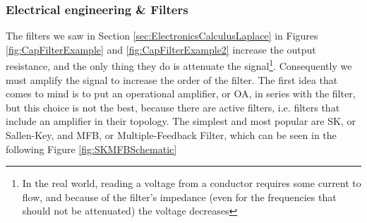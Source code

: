 \documentclass[a4paper, 10pt, final]{article} %
\begin{document}
    \subsubsection{Electrical engineering \& Filters}
    The filters we saw in Section \ref{sec:ElectronicsCalculusLaplace} in Figures \ref{fig:CapFilterExample} and \ref{fig:CapFilterExample2} increase the output resistance, and the only thing they do is attenuate the signal\footnote{In the real world, reading a voltage from a conductor requires some current to flow, and because of the filter's impedance (even for the frequencies that should not be attenuated) the voltage decreases}.
    Consequently we must amplify the signal to increase the order of the filter.
    The first idea that comes to mind is to put an operational amplifier, or OA, in series with the filter, but this choice is not the best, because there are active filters, i.e. filters that include an amplifier in their topology.
    The simplest and most popular are SK, or Sallen-Key, and MFB, or Multiple-Feedback Filter, which can be seen in the following Figure \ref{fig:SKMFBSchematic}
\end{document}
